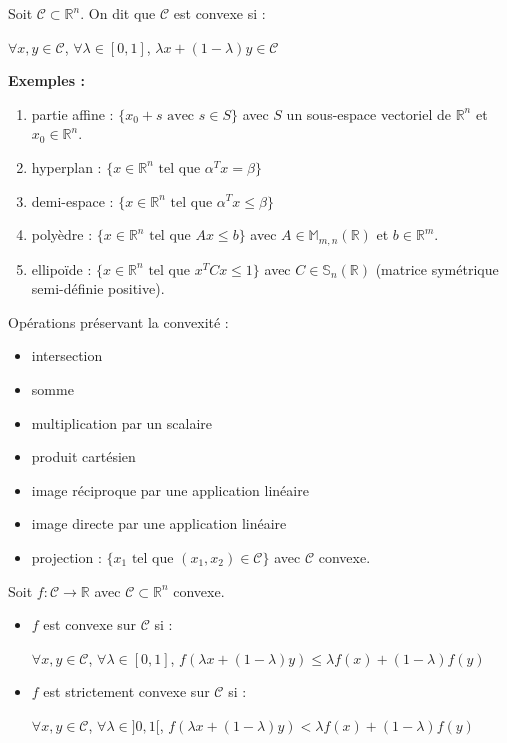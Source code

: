 \documentclass[12pt,a4paper]{article}
\newcommand{\propriete}[2]{%
    \begin{tcolorbox}[colback=white,colframe=green!25!white,title=\textbf{Propriété #1}, coltitle=black]
        #2
    \end{tcolorbox}
}
\newcommand{\definition}[2]{%
    \begin{tcolorbox}[colback=white,colframe=blue!25!white,title=\textbf{Définition #1}, coltitle=black]
        #2
    \end{tcolorbox}
}
\begin{document}
\definition{}{Soit $\mathcal{C} \subset \mathbb{R}^n$. On dit que $\mathcal{C}$ est convexe si :
\begin{center}
    $\forall x, y \in \mathcal{C}$, $\forall \lambda \in [0, 1]$, $\lambda x + (1 - \lambda) y \in \mathcal{C}$
\end{center}
}


\noindent\textbf{Exemples :}
\begin{enumerate}[label=\roman*.]
    \item partie affine : $\{x_0 + s \text{ avec } s \in S\}$ avec $S$ un sous-espace vectoriel de $\mathbb{R}^n$ et $x_0 \in \mathbb{R}^n$.
    \item hyperplan : $\{x \in \mathbb{R}^n \text{ tel que } \alpha^T x = \beta\}$
    \item demi-espace : $\{x \in \mathbb{R}^n \text{ tel que } \alpha^T x \leq \beta\}$
    \item polyèdre : $\{x \in \mathbb{R}^n \text{ tel que } Ax \leq b\}$ avec $A \in \mathbb{M}_{m,n}(\mathbb{R})$ et $b \in \mathbb{R}^m$.
    \item ellipoïde : $\{x \in \mathbb{R}^n \text{ tel que } x^TCx \leq 1\}$ avec $C \in \mathbb{S}_n(\mathbb{R})$ (matrice symétrique semi-définie positive).\\
\end{enumerate}


\propriete{}{Opérations préservant la convexité :
    \begin{itemize}
        \item intersection
        \item somme
        \item multiplication par un scalaire
        \item produit cartésien
        \item image réciproque par une application linéaire
        \item image directe par une application linéaire
        \item projection : $\{x_1 \text{ tel que } (x_1, x_2) \in \mathcal{C}\}$ avec $\mathcal{C}$ convexe.
    \end{itemize}
}

\definition{- Fonctions convexes}{
    Soit $f : \mathcal{C} \rightarrow \mathbb{R}$ avec $\mathcal{C} \subset \mathbb{R}^n$ convexe.
    \begin{itemize}
        \item $f$ est convexe sur $\mathcal{C}$ si : 
        \begin{center}
            $\forall x, y \in \mathcal{C}$, $\forall \lambda \in [0, 1]$, $f(\lambda x + (1 - \lambda) y) \leq \lambda f(x) + (1 - \lambda) f(y)$
        \end{center}
        \item $f$ est strictement convexe sur $\mathcal{C}$ si :
        \begin{center}
            $\forall x, y \in \mathcal{C}$, $\forall \lambda \in ]0, 1[$, $f(\lambda x + (1 - \lambda) y) < \lambda f(x) + (1 - \lambda) f(y)$
        \end{center}
    \end{itemize}
}
\end{document}
